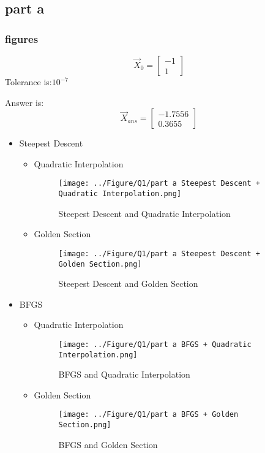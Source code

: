 \subsection{part a}
\subsubsection{figures}
$$\vec X_0 = \begin{bmatrix}
	-1\\1
\end{bmatrix}$$
Tolerance is:$10^{-7}$


Answer is:
 $$\vec X_{ans} = \begin{bmatrix}
 	-1.7556\\
 	0.3655
 \end{bmatrix}$$
\newpage
\begin{itemize}
	\item Steepest Descent
	\begin{itemize}
		\item Quadratic Interpolation
		\begin{figure}[H]
			\caption{Steepest Descent and Quadratic Interpolation}
			\centering
			\texttt{[image: ../Figure/Q1/part a Steepest Descent + Quadratic Interpolation.png]}
		\end{figure}
		\item Golden Section
		\begin{figure}[H]
			\caption{Steepest Descent and Golden Section}
			\centering
			\texttt{[image: ../Figure/Q1/part a Steepest Descent + Golden Section.png]}
		\end{figure}
	\end{itemize}
	\item BFGS
	\begin{itemize}
		\item Quadratic Interpolation
		\begin{figure}[H]
			\caption{BFGS and Quadratic Interpolation}
			\centering
			\texttt{[image: ../Figure/Q1/part a BFGS + Quadratic Interpolation.png]}
		\end{figure}
		\item Golden Section
			\begin{figure}[H]
				\caption{BFGS and Golden Section}
				\centering
				\texttt{[image: ../Figure/Q1/part a BFGS + Golden Section.png]}
		\end{figure}
	\end{itemize}
\end{itemize}
